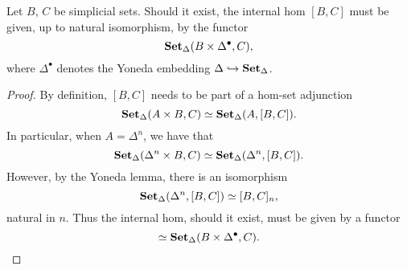 \documentclass[main.tex]{subfiles}
\begin{document}
\begin{lemma}
  \label{lemma:form_of_internal_hom}
  Let $B$, $C$ be simplicial sets. Should it exist, the internal hom $[B, C]$ must be given, up to natural isomorphism, by the functor
  \begin{equation*}
    \operatorname{\mathbf{Set}_{\Delta}}(B \times \Delta^{\bullet}, C),
  \end{equation*}
  where $\Delta^{\bullet}$ denotes the Yoneda embedding $\Delta \hookrightarrow \operatorname{\mathbf{Set}_{\Delta}}$.
\end{lemma}
\begin{proof}
  By definition, $[B, C]$ needs to be part of a hom-set adjunction
  \begin{equation*}
    \operatorname{\mathbf{Set}_{\Delta}}(A \times B, C) \simeq \operatorname{\mathbf{Set}_{\Delta}}(A, [B, C]).
  \end{equation*}
  In particular, when $A = \Delta^{n}$, we have that
  \begin{equation*}
    \operatorname{\mathbf{Set}_{\Delta}}(\Delta^{n} \times B, C) \simeq \operatorname{\mathbf{Set}_{\Delta}}(\Delta^{n}, [B, C]).
  \end{equation*}
  However, by the Yoneda lemma, there is an isomorphism
  \begin{equation*}
    \operatorname{\mathbf{Set}_{\Delta}}(\Delta^{n}, [B, C]) \simeq [B, C]_{n},
  \end{equation*}
  natural in $n$. Thus the internal hom, should it exist, must be given by a functor
  \begin{equation*}
    [B, C] \simeq \SSet(B \times \Delta^{\bullet}, C).
  \end{equation*}
\end{proof}
\end{document}
